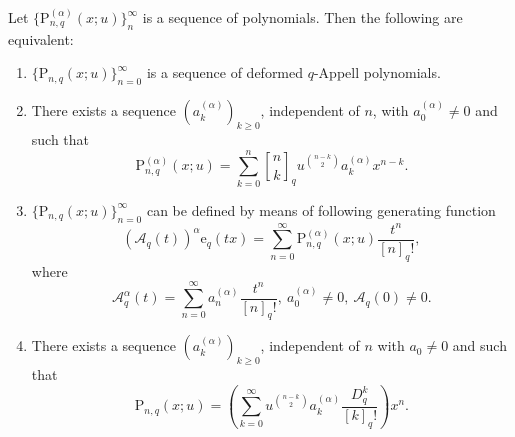 \documentclass[10pt,a4paper]{amsart}
\newcommand{\A}{\mathcal{A}}
\newcommand{\e}{\mathrm{e}}
\newcommand{\p}{\mathrm{P}}
\newcommand{\qbinom}{\genfrac{[}{]}{0pt}{}}
\begin{document}
\begin{theorem}\label{theo-charac}
Let $\{\p_{n,q}^{(\alpha)}(x;u)\}_{n}^{\infty}$ is a sequence of polynomials. Then the following are equivalent:
\begin{enumerate}
    \item $\{\p_{n,q}(x;u)\}_{n=0}^{\infty}$ is a sequence of deformed $q$-Appell polynomials.
    \item There exists a sequence $(a_{k}^{(\alpha)})_{k\geq0}$, independent of $n$, with $a_{0}^{(\alpha)}\neq0$ and such that
    \begin{equation*}
        \p_{n,q}^{(\alpha)}(x;u)=\sum_{k=0}^{n}\qbinom{n}{k}_{q}u^{\binom{n-k}{2}}a_{k}^{(\alpha)}x^{n-k}.
    \end{equation*}
    \item $\{\p_{n,q}(x;u)\}_{n=0}^{\infty}$ can be defined by means of following generating function 
    \begin{equation*}
        (\A_{q}(t))^{\alpha}\e_{q}(tx)=\sum_{n=0}^{\infty}\p_{n,q}^{(\alpha)}(x;u)\frac{t^n}{[n]_{q}!},
    \end{equation*}
    where 
    \begin{equation*}
        \A_{q}^{\alpha}(t)=\sum_{n=0}^{\infty}a_{n}^{(\alpha)}\frac{t^n}{[n]_{q}!},\ a_{0}^{(\alpha)}\neq0,\ \A_{q}(0)\neq0.
    \end{equation*}
    \item There exists a sequence $(a_{k}^{(\alpha)})_{k\geq0}$, independent of $n$ with $a_{0}\neq0$ and such that
    \begin{equation*}
        \p_{n,q}(x;u)=\left(\sum_{k=0}^{\infty}u^{\binom{n-k}{2}}a_{k}^{(\alpha)}\frac{D_{q}^{k}}{[k]_{q}!}\right)x^n.
    \end{equation*}
\end{enumerate}
\end{theorem}
\end{document}
